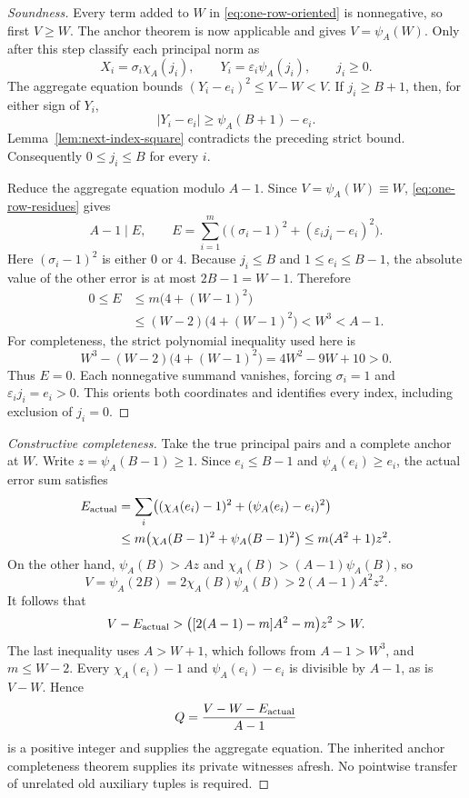\begin{proof}[Soundness]
Every term added to $W$ in \eqref{eq:one-row-oriented} is nonnegative,
so first $V\ge W$.  The anchor theorem is now applicable and gives
$V=\psi_A(W)$.  Only after this step classify each principal norm as
\[
 X_i=\sigma_i\chi_A(j_i),\qquad
 Y_i=\varepsilon_i\psi_A(j_i),\qquad j_i\ge0.
\]
The aggregate equation bounds $(Y_i-e_i)^2\le V-W<V$.  If
$j_i\ge B+1$, then, for either sign of $Y_i$,
\[
 |Y_i-e_i|\ge\psi_A(B+1)-e_i.
\]
Lemma~\ref{lem:next-index-square} contradicts the preceding strict
bound.  Consequently $0\le j_i\le B$ for every $i$.

Reduce the aggregate equation modulo $A-1$.  Since
$V=\psi_A(W)\equiv W$, \eqref{eq:one-row-residues} gives
\[
 A-1\mid E,
 \qquad
 E=\sum_{i=1}^m\bigl((\sigma_i-1)^2+
                         (\varepsilon_i j_i-e_i)^2\bigr).
\]
Here $(\sigma_i-1)^2$ is either $0$ or $4$.  Because $j_i\le B$ and
$1\le e_i\le B-1$, the absolute value of the other error is at most
$2B-1=W-1$.  Therefore
\begin{align*}
 0\le E&\le m\bigl(4+(W-1)^2\bigr)\\
       &\le(W-2)\bigl(4+(W-1)^2\bigr)<W^3<A-1.
\end{align*}
For completeness, the strict polynomial inequality used here is
\[
 W^3-(W-2)\bigl(4+(W-1)^2\bigr)=4W^2-9W+10>0.
\]
Thus $E=0$.  Each nonnegative summand vanishes, forcing
$\sigma_i=1$ and $\varepsilon_i j_i=e_i>0$.  This orients both
coordinates and identifies every index, including exclusion of $j_i=0$.
\end{proof}

\begin{proof}[Constructive completeness]
Take the true principal pairs and a complete anchor at $W$.  Write
$z=\psi_A(B-1)\ge1$.  Since $e_i\le B-1$ and $\psi_A(e_i)\ge e_i$,
the actual error sum satisfies
\begin{align*}
 E_{\rm actual}
 &=\sum_i\bigl((\chi_A(e_i)-1)^2+
                     (\psi_A(e_i)-e_i)^2\bigr)\\
 &\le m\bigl(\chi_A(B-1)^2+\psi_A(B-1)^2\bigr)
 \le m(A^2+1)z^2.
\end{align*}
On the other hand, $\psi_A(B)>Az$ and
$\chi_A(B)>(A-1)\psi_A(B)$, so
\[
 V=\psi_A(2B)=2\chi_A(B)\psi_A(B)>2(A-1)A^2z^2.
\]
It follows that
\[
 V-E_{\rm actual}
  >\bigl([2(A-1)-m]A^2-m\bigr)z^2>W.
\]
The last inequality uses $A>W+1$, which follows from $A-1>W^3$, and
$m\le W-2$.  Every $\chi_A(e_i)-1$ and $\psi_A(e_i)-e_i$ is divisible
by $A-1$, as is $V-W$.  Hence
\begin{equation}\label{eq:one-row-Q-witness}
 Q=\frac{V-W-E_{\rm actual}}{A-1}
\end{equation}
is a positive integer and supplies the aggregate equation.  The
inherited anchor completeness theorem supplies its private witnesses
afresh.  No pointwise transfer of unrelated old auxiliary tuples is
required.
\end{proof}

